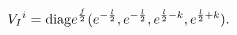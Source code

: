 \begin{equation}
V_I{}^i = {\rm diag} e^{\frac{f}{2}}( e^{-\frac{l}{2}},  e^{-\frac{l}{2}},
e^{\frac{l}{2}-k},  e^{\frac{l}{2}+k}%
).
\end{equation}

